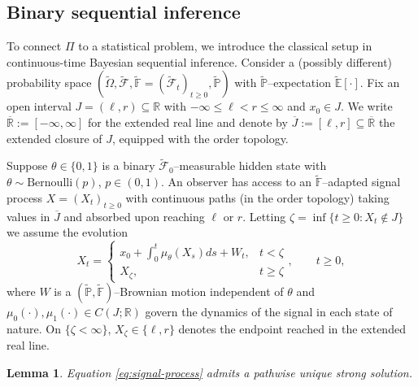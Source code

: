 \documentclass[11pt, reqno]{amsart}
\theoremstyle{plain}
\newtheorem{lemma}[theorem]{Lemma}
\theoremstyle{remark}
\numberwithin{equation}{section}
\begin{document}
\subsection{Binary sequential inference}\label{sec:bin-seq-inf}
To connect $\Pi$ to a statistical problem, we introduce 
%
the classical setup in continuous-time Bayesian sequential inference. Consider a (possibly different) probability space $(\widetilde{\Omega}, \widetilde{\mathcal{F}},\widetilde{\mathbb{F}}=(\widetilde{\mathcal{F}}_t)_{t\geq0}, \widetilde{\mathbb{P}})$ with $\widetilde{\mathbb{P}}$--expectation $\widetilde{\mathbb{E}}[\cdot]$. Fix an open interval $J=(\ell,r)\subseteq\mathbb R$ with $-\infty\leq\ell<r\leq\infty$ and $x_0\in J$.  We write $\overline{\mathbb R}:=[-\infty,\infty]$ for the extended real line
and denote by $\overline J:=[\ell,r]\subseteq\overline{\mathbb R}$ the extended closure of $J$, equipped with the order topology.

Suppose $\theta\in\{0,1\}$ is a binary $\widetilde{\mathcal{F}}_0$--measurable hidden state with $\theta\sim\mathrm{Bernoulli}(p)$, $p\in(0,1)$. An observer has access to an $\widetilde{\mathbb{F}}$--adapted signal process $X=(X_t)_{t\geq0}$  with continuous
paths (in the order topology) taking values in $\overline{J}$ and absorbed upon reaching $\ell$ or $r$.
Letting $\zeta=\inf\{t\geq0:X_t\not\in J\}$ we assume the evolution
\begin{equation}\label{eq:signal-process}
  X_t=\begin{cases}
      x_0 + \int_0^{t}\mu_\theta(X_s)ds+W_{t}, & t<\zeta\\
      X_\zeta, & t\geq \zeta
  \end{cases}, \qquad t\geq0,
\end{equation}
where $W$ is a $(\widetilde{\mathbb{P}},\widetilde{\mathbb{F}})$--Brownian motion independent of $\theta$ and $\mu_0(\cdot),\mu_1(\cdot)\in C(J;\mathbb{R})$ govern the dynamics of the signal in each state of nature. On $\{\zeta<\infty\}$, $X_\zeta\in\{\ell,r\}$ denotes the endpoint reached in the extended real line.%

\begin{lemma}\label{lem:signal-well-posed}
Equation
\eqref{eq:signal-process} admits a pathwise unique strong solution.
\end{lemma}
\end{document}
